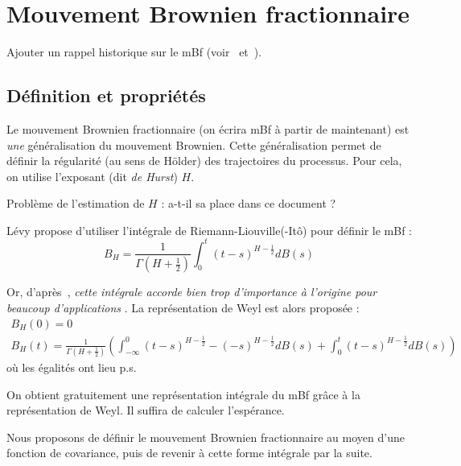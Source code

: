 \section{Mouvement Brownien fractionnaire}
\begin{alert}
  Ajouter un rappel historique sur le mBf
  (voir~\cite[p.~6]{biagini2008} et~\cite{mandelbrot1968}).
\end{alert}
\subsection{Définition et propriétés}

Le mouvement Brownien fractionnaire (on écrira mBf à partir de
maintenant) est \emph{une} gé\-né\-ra\-li\-sa\-tion du mouvement
Brownien. Cette gé\-né\-ra\-li\-sa\-tion permet de définir la
régularité (au sens de Hölder) des trajectoires du processus. Pour
cela, on utilise l'exposant (dit \emph{de Hurst}) $H$.

\begin{question}
  Problème de l'estimation de $H$ : a-t-il sa place dans ce document ?
\end{question}

Lévy propose d'utiliser l'intégrale de Riemann-Liouville(-Itô) pour
définir le mBf :
\begin{equation}
  B_H = \frac{1}{\Gamma(H + \frac{1}{2})} \int_0^t (t-s)^{H-\frac{1}{2}} dB(s)
\end{equation}

Or, d'après~\cite{mandelbrot1968}, \emph{\og cette intégrale accorde
  bien trop d'importance à l'origine pour beaucoup
  d'ap\-pli\-ca\-tions \fg{}}. La re\-pré\-sen\-ta\-tion de Weyl est
alors proposée :
\begin{gather}
  B_H(0) = 0\\
  B_H(t) = \frac{1}{\Gamma(H+\frac{1}{2})}\left(\int_{-\infty}^0(t-s)^{H-\frac{1}{2}}-(-s)^{H-\frac{1}{2}}dB(s) + \int_0^t(t-s)^{H-\frac{1}{2}}dB(s) \right)
\end{gather}
où les égalités ont lieu p.s.

\begin{alert}
  On obtient gratuitement une représentation intégrale du mBf grâce à
  la re\-pré\-sen\-ta\-tion de Weyl. Il suffira de calculer l'espérance.
\end{alert}

Nous proposons de définir le mouvement Brownien fractionnaire au moyen
d'une fonction de covariance, puis de revenir à cette forme intégrale
par la suite.

